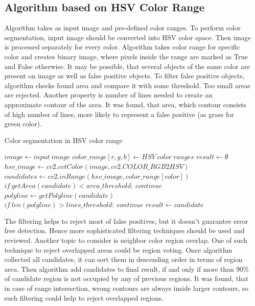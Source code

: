 \documentclass{ctuthesis}
\begin{document}
\subsection{Algorithm based on HSV Color Range} \label{csa}

Algorithm takes as input image and pre-defined color ranges. To perform color segmentation, input image should be converted into HSV color space. Then image is processed separately for every color. Algorithm takes color range for specific color and creates binary image, where pixels inside the range are marked as True and False otherwise. It may be possible, that several objects of the same color are present on image as well as false positive objects. 
To filter false positive objects, algorithm checks found area and compare it with some threshold. Too small areas are rejected. Another property is number of lines needed to create an approximate contour of the area. It was found, that area, which contour consists of high number of lines, more likely to represent a false positive (as grass for green color).

\begin{algorithm}
\caption{Color segmentation in HSV color range}\label{hsv}
\begin{algorithmic}[1]

\State $image \gets input\ image$
\State $color\_range[r,g,b] \gets HSV\ color\ ranges$
\State $result \gets \emptyset$
\State $hsv\_image \gets cv2.cvtColor(image, cv2.COLOR\_RGB2HSV)$
\State $candidates \gets cv2.inRange(hsv\_image, color\_range[color])$
\State $if\ getArea(candidate) < area\_threshold:\ continue$
\State $polyline \gets getPolyline(candidate)$
\State $if\ len(polyline) > lines\_threshold:\ continue$
\State $result \gets candidate$
\EndFor
\EndFor
\EndProcedure

\end{algorithmic}
\end{algorithm}

The filtering helps to reject most of false positives, but it doesn't guarantee error free detection. Hence more sophisticated filtering techniques should be used and reviewed. Another topic to consider is neighbor color region overlap. One of such technique to reject overlapped areas could be region voting. Once algorithm collected all candidates, it can sort them in descending order in terms of region area. Then algorithm add candidates to final result, if and only if more than 90\% of candidate region is not occupied by any of previous regions. It was found, that in case of range intersection, wrong contours are always inside larger contours, so such filtering could help to reject overlapped regions.
\end{document}
